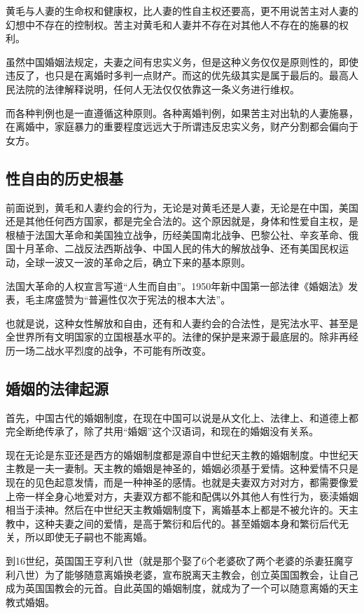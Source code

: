 黄毛与人妻的生命权和健康权，比人妻的性自主权还要高，更不用说苦主对人妻的幻想中不存在的控制权。苦主对黄毛和人妻并不存在对其他人不存在的施暴的权利。

虽然中国婚姻法规定，夫妻之间有忠实义务，但是这种义务仅仅是原则性的，即使违反了，也只是在离婚时多判一点财产。而这的优先级其实是属于最后的。最高人民法院的法律解释说明，任何人无法仅仅依靠这一条义务进行维权。

而各种判例也是一直遵循这种原则。各种离婚判例，如果苦主对出轨的人妻施暴，在离婚中，家庭暴力的重要程度远远大于所谓违反忠实义务，财产分割都会偏向于女方。

\subsection{性自由的历史根基}

前面说到，黄毛和人妻约会的行为，无论是对黄毛还是人妻，无论是在中国，美国还是其他任何西方国家，都是完全合法的。这个原因就是，身体和性爱自主权，是根植于法国大革命和美国独立战争，历经美国南北战争、巴黎公社、辛亥革命、俄国十月革命、二战反法西斯战争、中国人民的伟大的解放战争、还有美国民权运动，全球一波又一波的革命之后，确立下来的基本原则。

法国大革命的人权宣言写道``人生而自由''。1950年新中国第一部法律《婚姻法》发表，毛主席盛赞为``普遍性仅次于宪法的根本大法''。

也就是说，这种女性解放和自由，还有和人妻约会的合法性，是宪法水平、甚至是全世界所有文明国家的立国根基水平的。法律的保护是来源于最底层的。除非再经历一场二战水平烈度的战争，不可能有所改变。

\subsection{婚姻的法律起源}

首先，中国古代的婚姻制度，在现在中国可以说是从文化上、法律上、和道德上都完全断绝传承了，除了共用``婚姻''这个汉语词，和现在的婚姻没有关系。

现在无论是东亚还是西方的婚姻制度都是源自中世纪天主教的婚姻制度。中世纪天主教是一夫一妻制。天主教的婚姻是神圣的，婚姻必须基于爱情。这种爱情不只是现在的见色起意发情，而是一种神圣的感情。也就是夫妻双方对对方，都需要像爱上帝一样全身心地爱对方，夫妻双方都不能和配偶以外其他人有性行为，亵渎婚姻相当于渎神。然后在中世纪天主教婚姻制度下，离婚基本上都是不被允许的。天主教中，这种夫妻之间的爱情，是高于繁衍和后代的。甚至婚姻本身和繁衍后代无关，所以即使无子嗣也不能离婚。

到16世纪，英国国王亨利八世（就是那个娶了6个老婆砍了两个老婆的杀妻狂魔亨利八世）为了能够随意离婚换老婆，宣布脱离天主教会，创立英国国教会，让自己成为英国国教会的元首。自此英国的婚姻制度，就成为了一个可以随意离婚的天主教式婚姻。

